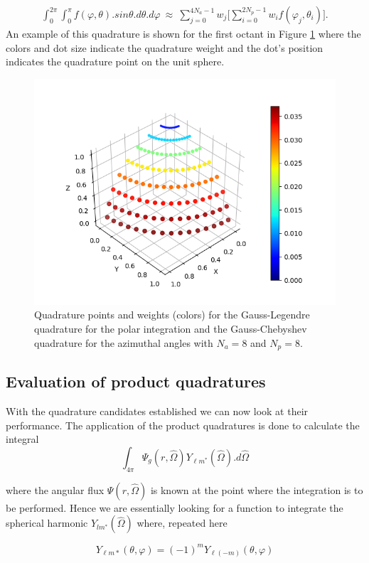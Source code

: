 \documentclass[11pt,letterpaper,titlepage]{article}
\newcommand{\beqn}{\begin{equation}
	\begin{aligned}}
\newcommand{\eeqn}{\end{aligned}
	\end{equation}}
\numberwithin{equation}{section}
\begin{document}
\begin{appendices}
\beqn
\int_0^{2\pi}\int_0^\pi f(\varphi,\theta).sin\theta.d\theta.d\varphi\ 
\approx \  \sum_{j=0}^{4N_a-1} w_j \biggr[
\sum_{i=0} ^{2N_p-1}   w_i f(\varphi_j,\theta_i)
\biggr].
\eeqn
\newline
An example of this quadrature is shown for the first octant in Figure \ref{fig:s8gausslegendrechebyshev} where the colors and dot size indicate the quadrature weight and the dot's position indicates the quadrature point on the unit sphere.
\begin{figure}[h]
\centering
\includegraphics[width=0.7\linewidth]{Figures/Gauss-Legendre-Chebyshev.png}
\caption{Quadrature points and weights (colors) for the Gauss-Legendre quadrature for the polar integration and the Gauss-Chebyshev quadrature for the azimuthal angles with $N_a=8$ and $N_p=8$.}
\label{fig:s8gausslegendrechebyshev}
\end{figure}


\newpage
\subsection{Evaluation of product quadratures}
With the quadrature candidates established we can now look at their performance. The application of the product quadratures is done to calculate the integral
\begin{equation*}
\int_{4\pi} \Psi_g(r,\hat{\Omega}) Y_{\ell m^*}(\hat{\Omega}).d\hat{\Omega} 
\end{equation*}

where the angular flux $\Psi(r,\hat{\Omega})$ is known at the point where the integration is to be performed. Hence we are essentially looking for a function to integrate the spherical harmonic $Y_{lm^*}(\hat{\Omega})$ where, repeated here

$$Y_{\ell m*}(\theta ,\varphi ) = (-1)^mY_{\ell (-m)}(\theta ,\varphi )$$


\end{appendices}
\end{document}
